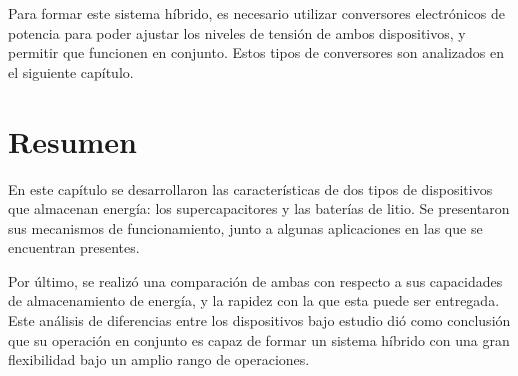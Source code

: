 Para formar este sistema híbrido, es necesario utilizar conversores electrónicos de potencia para poder ajustar los niveles de tensión de ambos dispositivos, y permitir que funcionen en conjunto. Estos tipos de conversores son analizados en el siguiente capítulo.   

\section{Resumen}

En este capítulo se desarrollaron las características de dos tipos de dispositivos que almacenan energía: los supercapacitores y las baterías de litio. Se presentaron sus mecanismos de funcionamiento, junto a algunas aplicaciones en las que se encuentran presentes.

Por último, se realizó una comparación de ambas con respecto a sus capacidades de almacenamiento de energía, y la rapidez con la que esta puede ser entregada. Este análisis de diferencias entre los dispositivos bajo estudio dió como conclusión que su operación en conjunto es capaz de formar un sistema híbrido con una gran flexibilidad bajo un amplio rango de operaciones.

\newpage